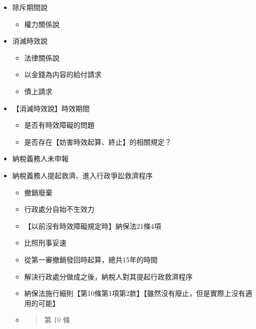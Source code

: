 \documentclass[]{ctexbook}
\providecommand{\tightlist}{%
  \setlength{\itemsep}{0pt}\setlength{\parskip}{0pt}}
\begin{document}
\begin{itemize}
\item
  除斥期間說

  \begin{itemize}
  \tightlist
  \item
    權力關係說
  \end{itemize}
\item
  消滅時效說

  \begin{itemize}
  \tightlist
  \item
    法律關係說
  \item
    以金錢為内容的給付請求
  \item
    債上請求
  \end{itemize}
\item
  【消滅時效說】時效期間

  \begin{itemize}
  \tightlist
  \item
    是否有時效障礙的問題
  \item
    是否存在【妨害時效起算、終止】的相關規定？
  \end{itemize}
\item
  納稅義務人未申報
\item
  納稅義務人提起救濟、進入行政爭訟救濟程序

  \begin{itemize}
  \item
    撤銷廢棄
  \item
    行政處分自始不生效力
  \item
    【以前沒有時效障礙規定時】納保法21條4項
  \item
    比照刑事妥速
  \item
    從第一審撤銷發回時起算，總共15年的時間
  \item
    解決行政處分做成之後，納稅人對其提起行政救濟程序
  \item
    納保法施行細則【第10條第1項第2款】【雖然沒有廢止，但是實際上沒有適用的可能】
  \item
    \begin{quote}
    第 10 條


\end{quote}
\end{itemize}
\end{itemize}
\end{document}
